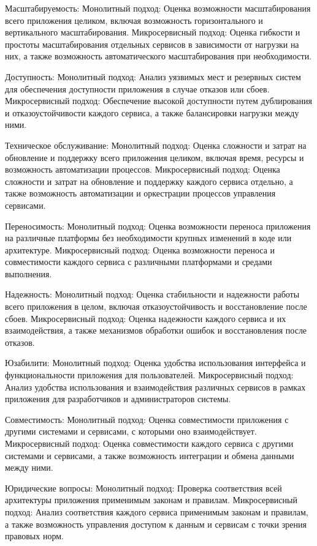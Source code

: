     Масштабируемость:
        Монолитный подход: Оценка возможности масштабирования всего приложения целиком, включая возможность горизонтального и вертикального масштабирования.
        Микросервисный подход: Оценка гибкости и простоты масштабирования отдельных сервисов в зависимости от нагрузки на них, а также возможность автоматического масштабирования при необходимости.

    Доступность:
        Монолитный подход: Анализ уязвимых мест и резервных систем для обеспечения доступности приложения в случае отказов или сбоев.
        Микросервисный подход: Обеспечение высокой доступности путем дублирования и отказоустойчивости каждого сервиса, а также балансировки нагрузки между ними.

    Техническое обслуживание:
        Монолитный подход: Оценка сложности и затрат на обновление и поддержку всего приложения целиком, включая время, ресурсы и возможность автоматизации процессов.
        Микросервисный подход: Оценка сложности и затрат на обновление и поддержку каждого сервиса отдельно, а также возможность автоматизации и оркестрации процессов управления сервисами.

    Переносимость:
        Монолитный подход: Оценка возможности переноса приложения на различные платформы без необходимости крупных изменений в коде или архитектуре.
        Микросервисный подход: Оценка возможности переноса и совместимости каждого сервиса с различными платформами и средами выполнения.

    Надежность:
        Монолитный подход: Оценка стабильности и надежности работы всего приложения в целом, включая отказоустойчивость и восстановление после сбоев.
        Микросервисный подход: Оценка надежности каждого сервиса и их взаимодействия, а также механизмов обработки ошибок и восстановления после отказов.

    Юзабилити:
        Монолитный подход: Оценка удобства использования интерфейса и функциональности приложения для пользователей.
        Микросервисный подход: Анализ удобства использования и взаимодействия различных сервисов в рамках приложения для разработчиков и администраторов системы.

    Совместимость:
        Монолитный подход: Оценка совместимости приложения с другими системами и сервисами, с которыми оно взаимодействует.
        Микросервисный подход: Оценка совместимости каждого сервиса с другими системами и сервисами, а также возможность интеграции и обмена данными между ними.

    Юридические вопросы:
        Монолитный подход: Проверка соответствия всей архитектуры приложения применимым законам и правилам.
        Микросервисный подход: Анализ соответствия каждого сервиса применимым законам и правилам, а также возможность управления доступом к данным и сервисам с точки зрения правовых норм.

